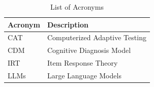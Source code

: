 \begin{table}[!t]
\centering
\caption{List of Acronyms}
\label{tab:acronyms}
\begin{tabular}{ll}
\hline
\textbf{Acronym} & \textbf{Description} \\
\hline
CAT  & Computerized Adaptive Testing \\
CDM  & Cognitive Diagnosis Model \\
IRT  & Item Response Theory \\
LLMs & Large Language Models \\
\hline
\end{tabular}
\end{table}